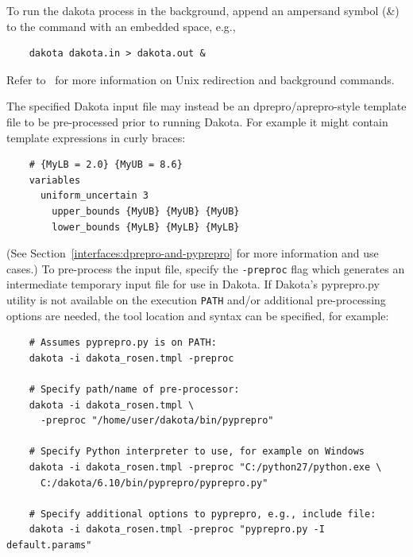 
To run the dakota process in the background, append an ampersand
symbol (\&) to the command with an embedded space, e.g.,
\begin{small}
\begin{verbatim}
    dakota dakota.in > dakota.out &
\end{verbatim}
\end{small}

Refer to~\cite{And86} for more information on Unix redirection and
background commands.

The specified Dakota input file may instead be an
dprepro/aprepro-style template file to be pre-processed prior to
running Dakota. For example it might contain template expressions in
curly braces:
\begin{small}
\begin{verbatim}
    # {MyLB = 2.0} {MyUB = 8.6}
    variables
      uniform_uncertain 3
        upper_bounds {MyUB} {MyUB} {MyUB}
        lower_bounds {MyLB} {MyLB} {MyLB}
\end{verbatim}
\end{small}

(See Section~\ref{interfaces:dprepro-and-pyprepro} for more
information and use cases.) To pre-process the input file, specify the
\texttt{-preproc} flag which generates an intermediate temporary input
file for use in Dakota. If Dakota's pyprepro.py utility is not
available on the execution {\tt PATH} and/or additional pre-processing
options are needed, the tool location and syntax can be specified, for
example:

\begin{small}
\begin{verbatim}
    # Assumes pyprepro.py is on PATH:
    dakota -i dakota_rosen.tmpl -preproc
    
    # Specify path/name of pre-processor:
    dakota -i dakota_rosen.tmpl \
      -preproc "/home/user/dakota/bin/pyprepro"
    
    # Specify Python interpreter to use, for example on Windows
    dakota -i dakota_rosen.tmpl -preproc "C:/python27/python.exe \
      C:/dakota/6.10/bin/pyprepro/pyprepro.py"
    
    # Specify additional options to pyprepro, e.g., include file:
    dakota -i dakota_rosen.tmpl -preproc "pyprepro.py -I default.params"
\end{verbatim}
\end{small}

